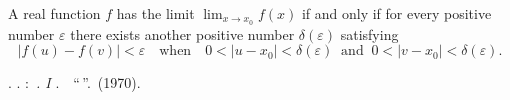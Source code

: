 \documentclass[12pt]{article}
\theoremstyle{definition}
\begin{document}
A real function $f$ has the limit $\displaystyle\lim_{x\to x_0}f(x)$ if and only if for every positive number $\varepsilon$ there exists another positive number $\delta(\varepsilon)$ satisfying
 $$|f(u)-f(v)| < \varepsilon\quad \mbox{when}\quad 
0 < |u-x_0| < \delta(\varepsilon)\;\;\mbox{and}\;\;0 < |v-x_0| < \delta(\varepsilon).$$ 

\begin{thebibliography}{7}
 \CYRL. \CYRD. \CYRK\cyru\cyrd\cyrr\cyrya\cyrv\cyrc\cyre\cyrv: 
{\em \CYRM\cyra\cyrt\cyre\cyrm\cyra\cyrt\cyri\cyrch\cyre\cyrs\cyrk\cyri\cyrishrt \,\cyra\cyrn\cyra\cyrl\cyri\cyrz. I \cyrt\cyro\cyrm}. \,\CYRI\cyrz\cyrd\cyra\cyrt\cyre\cyrl\cyrsftsn\cyrs\cyrt\cyrv\cyro \,
``\CYRV\cyrery\cyrs\cyrsh\cyra\cyrya \,\cyrsh\cyrk\cyro\cyrl\cyra''. \CYRM\cyro\cyrs\cyrk\cyrv\cyra \,(1970).
\end{thebibliography}
\end{document}
